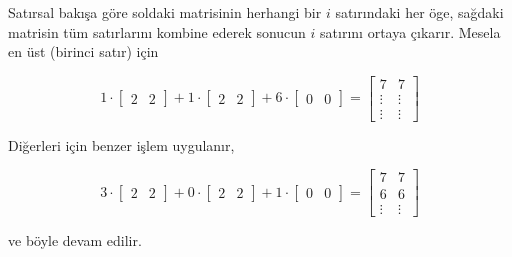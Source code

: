 \documentclass[12pt,fleqn]{article}\usepackage{../../common}
\begin{document}
Satırsal bakışa göre soldaki matrisinin herhangi bir $i$ satırındaki her
öge, sağdaki matrisin tüm satırlarını kombine ederek sonucun $i$ satırını
ortaya çıkarır. Mesela en üst (birinci satır) için

$$ 
1 \cdot
\left[\begin{array}{cc}
2 & 2
\end{array}\right] +
1 \cdot
\left[\begin{array}{cc}
2 & 2
\end{array}\right] + 
6 \cdot
\left[\begin{array}{cc}
0 & 0
\end{array}\right] 
=
\left[\begin{array}{cc}
7 & 7 \\
\vdots & \vdots \\
\vdots & \vdots
\end{array}\right] 
$$

Diğerleri için benzer işlem uygulanır, 

$$ 
3 \cdot
\left[\begin{array}{cc}
2 & 2
\end{array}\right] +
0 \cdot
\left[\begin{array}{cc}
2 & 2
\end{array}\right] + 
1 \cdot
\left[\begin{array}{cc}
0 & 0
\end{array}\right] 
=
\left[\begin{array}{cc}
7 & 7 \\
6 & 6 \\
\vdots & \vdots
\end{array}\right] 
$$

ve böyle devam edilir.
\end{document}
